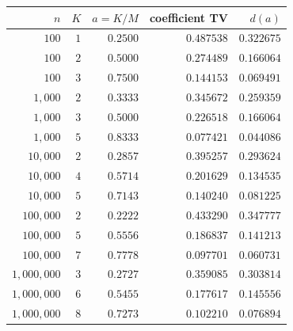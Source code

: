 \begin{tabular}{rrrrr}
\toprule
$n$ & $K$ & $a=K/M$ & coefficient TV & $d(a)$\\
\midrule
$100$ & $1$ & $0.2500$ & $0.487538$ & $0.322675$\\
$100$ & $2$ & $0.5000$ & $0.274489$ & $0.166064$\\
$100$ & $3$ & $0.7500$ & $0.144153$ & $0.069491$\\
$1,000$ & $2$ & $0.3333$ & $0.345672$ & $0.259359$\\
$1,000$ & $3$ & $0.5000$ & $0.226518$ & $0.166064$\\
$1,000$ & $5$ & $0.8333$ & $0.077421$ & $0.044086$\\
$10,000$ & $2$ & $0.2857$ & $0.395257$ & $0.293624$\\
$10,000$ & $4$ & $0.5714$ & $0.201629$ & $0.134535$\\
$10,000$ & $5$ & $0.7143$ & $0.140240$ & $0.081225$\\
$100,000$ & $2$ & $0.2222$ & $0.433290$ & $0.347777$\\
$100,000$ & $5$ & $0.5556$ & $0.186837$ & $0.141213$\\
$100,000$ & $7$ & $0.7778$ & $0.097701$ & $0.060731$\\
$1,000,000$ & $3$ & $0.2727$ & $0.359085$ & $0.303814$\\
$1,000,000$ & $6$ & $0.5455$ & $0.177617$ & $0.145556$\\
$1,000,000$ & $8$ & $0.7273$ & $0.102210$ & $0.076894$\\
\bottomrule
\end{tabular}
